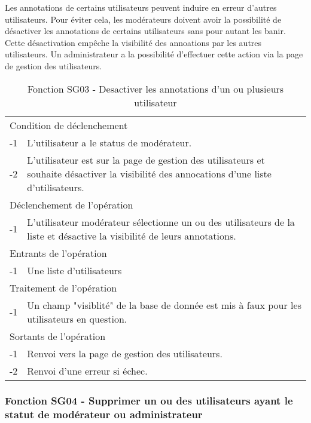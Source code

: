 \documentclass[a4paper]{article}
\begin{document}
Les annotations de certains utilisateurs peuvent induire en erreur d'autres utilisateurs. Pour éviter cela, les modérateurs doivent avoir la possibilité de désactiver les annotations de certains utilisateurs sans pour autant les banir. Cette désactivation empêche la visibilité des annoations par les autres utilisateurs. Un administrateur a la possibilité d'effectuer cette action via la page de gestion des utilisateurs. 

\begin{table}[H]
  \centering
   \small
	\begin{tabular}{|c|p{12cm}|}
   		\hline
   			\rowcolor{lightgray}\multicolumn{2}{|c|}{\textbf{Fonction SG03 - Desactiver les annotations d'un ou plusieurs utilisateur}} \\
   		\hline
   			\multicolumn{2}{|l|}{Condition de déclenchement} \\
   		\hline
   			-1 & L'utilisateur a le status de modérateur.\\
        	-2 & L'utilisateur est sur la page de gestion des utilisateurs et souhaite désactiver la visibilité des annocations d'une liste d'utilisateurs.\\
   		\hline
   			\multicolumn{2}{|l|}{Déclenchement de l'opération} \\
   		\hline
   			-1 & L'utilisateur modérateur sélectionne un ou des utilisateurs de la liste et désactive la visibilité de leurs annotations.\\
   		\hline
   			\multicolumn{2}{|l|}{Entrants de l'opération} \\
   		\hline
   			-1 & Une liste d'utilisateurs\\
   		\hline
   			\multicolumn{2}{|l|}{Traitement de l'opération} \\
  		\hline
   			-1 & Un champ "visiblité" de la base de donnée est mis à faux pour les utilisateurs en question.\\
   		\hline
   			\multicolumn{2}{|l|}{Sortants de l'opération} \\
   		\hline
   			-1 & Renvoi vers la page de gestion des utilisateurs.\\
        	-2 & Renvoi d'une erreur si échec.\\
   		\hline
	\end{tabular}
  \caption{Fonction SG03 - Desactiver les annotations d'un ou plusieurs utilisateur}
  \normalsize
  \label{tab: desactiver_utilisateur}
\end{table}

\subsubsection{Fonction SG04 - Supprimer un ou des utilisateurs ayant le statut de modérateur ou administrateur}
\end{document}
